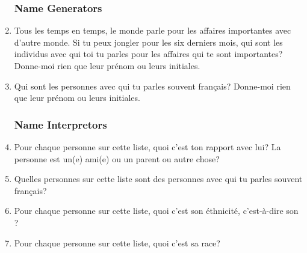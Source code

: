   \begin{enumerate}
  \subsubsection{Name Generators}
    \item Tous les temps en temps, le monde parle pour les affaires importantes avec d'autre monde. Si tu peux jongler pour les six derniers mois, qui sont les individus avec qui toi tu parles pour les affaires qui te sont importantes? Donne-moi rien que leur prénom ou leurs initiales.\\
    \item Qui sont les personnes avec qui tu parles souvent français? Donne-moi rien que leur prénom ou leurs initiales.\\
  \subsubsection{Name Interpretors}
    \item Pour chaque personne sur cette liste, quoi c'est ton rapport avec lui? La personne est un(e) ami(e) ou un parent ou autre chose?\\
    \item Quelles personnes sur cette liste sont des personnes avec qui tu parles souvent français?\\
    \item Pour chaque personne sur cette liste, quoi c'est son éthnicité, c'est-à-dire son ?\\
    \item Pour chaque personne sur cette liste, quoi c'est sa race?\\
  \end{enumerate}

